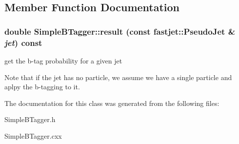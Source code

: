 \subsection{Member Function Documentation}
\hypertarget{classSimpleBTagger_3874e44fae139f956eb80003c68b0d7b}{
\subsubsection[result]{\setlength{\rightskip}{0pt plus 5cm}double Simple\-BTagger::result (const fastjet::Pseudo\-Jet \& {\em jet}) const}}
\label{classSimpleBTagger_3874e44fae139f956eb80003c68b0d7b}


get the b-tag probability for a given jet

Note that if the jet has no particle, we assume we have a single particle and aplpy the b-tagging to it. 

The documentation for this class was generated from the following files:\begin{CompactItemize}
\item 
Simple\-BTagger.h\item 
Simple\-BTagger.cxx\end{CompactItemize}
